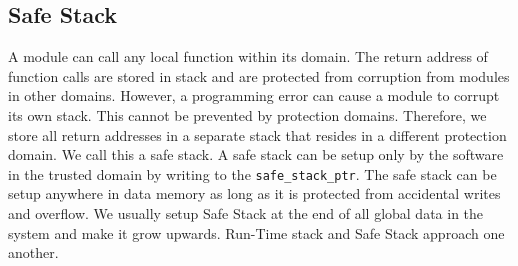\subsection{Safe Stack}
%
A module can call any local function within its domain.
%
The return address of function calls are stored in stack and are protected from corruption from modules in other domains.
%
However, a programming error can cause a module to corrupt its own stack.
%
This cannot be prevented by protection domains.
%
Therefore, we store all return addresses in a separate stack that resides in a different protection domain.
%
We call this a safe stack.
%
%
%
%
%
A safe stack can be setup only by the software in the trusted domain by writing to the \texttt{safe\_stack\_ptr}.
%
The safe stack can be setup anywhere in data memory as long as it is protected from accidental writes and overflow.
%
We usually setup Safe Stack at the end of all global data in the system and make it grow upwards.
%
Run-Time stack and Safe Stack approach one another.
%
%
%
%
%
%
%
%













